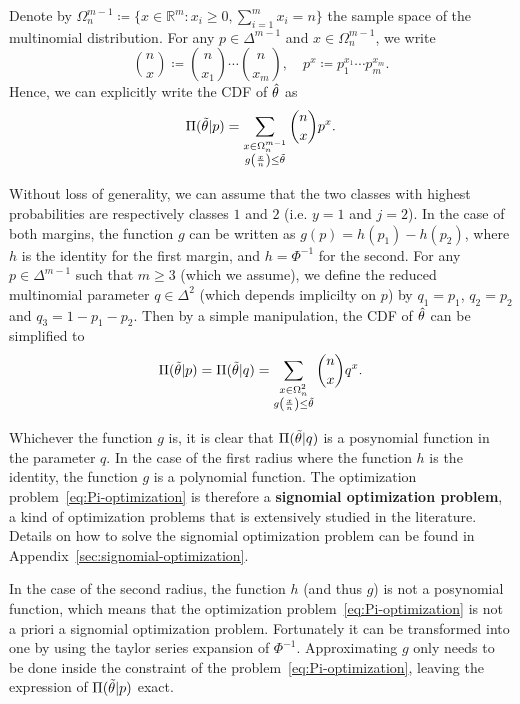 Denote by $\Omega^{m-1}_n\coloneqq\{x\in\mathbb{R}^m : x_i\geq0,\sum_{i=1}^m x_i = n\}$ the sample space of the multinomial distribution.
For any $p\in\Delta^{m-1}$ and $x\in\Omega^{m-1}_n$, we write
\[
    \binom{n}{x}\coloneqq\binom{n}{x_1}\cdots\binom{n}{x_m},\quad p^x\coloneqq p_1^{x_1}\cdots p_m^{x_m}.
\]
Hence, we can explicitly write the CDF of $\Hat{\theta}$ as
\[
    \Pi(\Tilde{\theta}|p) = \sum_{\substack{x\in\Omega^{m-1}_n\\g\left(\frac{x}{n}\right)\leq\Tilde{\theta}}}\binom{n}{x}p^x.
\]

Without loss of generality, we can assume that the two classes with highest probabilities are respectively classes $1$ and $2$ (i.e. $y=1$ and $j=2$).
In the case of both margins, the function $g$ can be written as $g(p)=h(p_{1})-h(p_{2})$, where $h$ is the identity for the first margin, and $h=\Phi^{-1}$ for the second.
For any $p\in\Delta^{m-1}$ such that $m\geq3$ (which we assume), we define the reduced multinomial parameter $q\in\Delta^2$ (which depends implicilty on $p$) by $q_1=p_1$, $q_2=p_2$ and $q_3=1-p_1-p_2$.
Then by a simple manipulation, the CDF of $\Hat{\theta}$ can be simplified to
\[
    \Pi(\Tilde{\theta}|p)=\Pi(\Tilde{\theta}|q)= \sum_{\substack{x\in\Omega^{2}_n\\g\left(\frac{x}{n}\right)\leq\Tilde{\theta}}}\binom{n}{x}q^x.
\]

Whichever the function $g$ is, it is clear that $\Pi(\Tilde{\theta}|q)$ is a posynomial function in the parameter $q$.
In the case of the first radius where the function $h$ is the identity, the function $g$ is a polynomial function.
The optimization problem~\eqref{eq:Pi-optimization} is therefore a \textbf{signomial optimization problem}, a kind of optimization problems that is extensively studied in the literature.
Details on how to solve the signomial optimization problem can be found in Appendix~\ref{sec:signomial-optimization}.

In the case of the second radius, the function $h$ (and thus $g$) is not a posynomial function, which means that the optimization problem~\eqref{eq:Pi-optimization} is not a priori a signomial optimization problem.
Fortunately it can be transformed into one by using the taylor series expansion of $\Phi^{-1}$.
Approximating $g$ only needs to be done inside the constraint of the problem~\eqref{eq:Pi-optimization}, leaving the expression of $\Pi(\Tilde{\theta}|p)$ exact.

